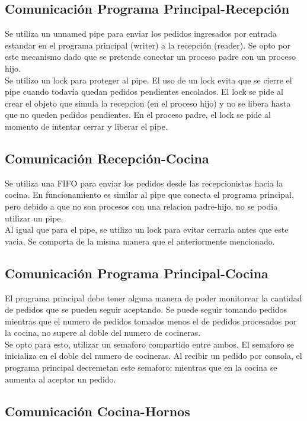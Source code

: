 \documentclass[11pt,spanish,a4paper,openany,notitlepage]{article}
\begin{document}
\subsection{Comunicación Programa Principal-Recepción}

Se utiliza un unnamed pipe para enviar los pedidos ingresados por entrada estandar en el programa 
principal (writer) a la recepción (reader). Se opto por este mecanismo dado que se pretende 
conectar un proceso padre con un proceso hijo.\\ 
Se utilizo un lock para proteger al pipe. El uso de un lock evita que se cierre el pipe cuando 
todavía quedan pedidos pendientes encolados. El lock se pide al crear el objeto que simula la 
recepcion (en el proceso hijo) y no se libera hasta que no queden pedidos pendientes. En el proceso 
padre, el lock se pide al momento de intentar cerrar y liberar el pipe.

\subsection{Comunicación Recepción-Cocina}

Se utiliza una FIFO para enviar los pedidos desde las recepcionistas hacia la cocina. En 
funcionamiento es similar al pipe que conecta el programa principal, pero debido a que no son 
procesos con una relacion padre-hijo, no se podia utilizar un pipe.\\
Al igual que para el pipe, se utilizo un lock para evitar cerrarla antes que este vacia. Se 
comporta de la misma manera que el anteriormente mencionado.

\subsection{Comunicación Programa Principal-Cocina}

El programa principal debe tener alguna manera de poder monitorear la cantidad de pedidos que se 
pueden seguir aceptando. Se puede seguir tomando pedidos mientras que el numero de pedidos tomados 
menos el de pedidos procesados por la cocina, no supere al doble del numero de cocineras.\\
Se opto para esto, utilizar un semaforo compartido entre ambos. El semaforo se inicializa en el 
doble del numero de cocineras. Al recibir un pedido por consola, el programa principal decremetan 
este semaforo; mientras que en la cocina se aumenta al aceptar un pedido.

\subsection{Comunicación Cocina-Hornos}
\end{document}
